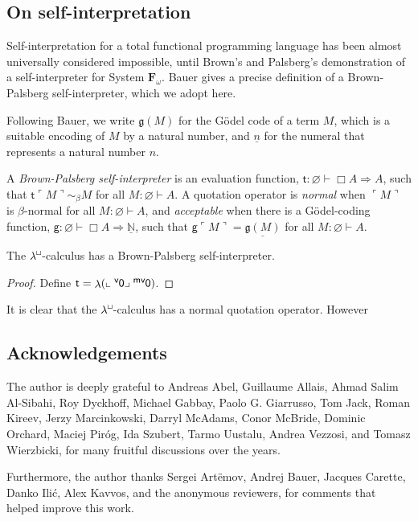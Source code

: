 \documentclass{entcs}
\newcommand{\ssmv}{\textsf{\small{mv}}}
\newcommand{\ssv}{\textsf{\small{v}}}
\newcommand{\R}{\mathrel{\Rightarrow}}
\newcommand{\sq}{\mathop{\Box}}
\renewcommand{\O}{\varnothing}
\renewcommand{\e}{\mathrel{\vdash}}
\newcommand{\lam}{\operatorname{\lambda}}
\newcommand{\quo}[1]{\mathopen{\ulcorner}{#1}\mathclose{\urcorner}}
\newcommand{\unquo}[2]{\mathopen{\llcorner}{#1}\mathclose{\lrcorner}{#2}}
\newcommand{\mvO}{\operatorname{^{\ssmv\mkern-1mu}\textsf{0}}}
\newcommand{\vO}{\operatorname{^{\ssv\mkern-1mu}\textsf{0}}}
\newcommand{\bconv}{\mathrel{\sim_{\beta}}}
\newcommand{\N}{\mathbb{N}}
\newcommand{\lambdabox}{\lambda^{\mkern-1mu\sq\mkern-3mu}}
\newcommand{\Fomega}{\textbf{F}_{\omega}}
\begin{document}
\pagebreak


\subsection*{On self-interpretation}

Self-interpretation for a total functional programming language has been almost universally considered impossible, until Brown's and Palsberg's \cite{BrownP16} demonstration of a self-interpreter for System $\Fomega$.  Bauer \cite{Bauer16} gives a precise definition of a Brown-Palsberg self-interpreter, which we adopt here.

Following Bauer, we write $\mathfrak{g}(M)$ for the G\"{o}del code of a term $M$, which is a suitable encoding of $M$ by a natural number, and $\underline{n}$ for the numeral that represents a natural number $n$.

\begin{definition}
  A \emph{Brown-Palsberg self-interpreter} is an evaluation function, $\textsf{t} : \O \e \sq A \R A$, such that $\textsf{t} \quo{M} \bconv M$ for all $M : \O \e A$.  A quotation operator is \emph{normal} when $\quo{M}$ is $\beta$-normal for all $M : \O \e A$, and \emph{acceptable} when there is a G\"{o}del-coding function, $\textsf{g} : \O \e \sq A \R \underline{\N}$, such that $\textsf{g} \quo{M} = \underline{\mathfrak{g}(M)}$ for all $M : \O \e A$.
\end{definition}

\begin{theorem}
  The $\lambdabox$-calculus has a Brown-Palsberg self-interpreter.
\end{theorem}
\begin{proof}
  Define $\textsf{t} = \lam (\unquo{\vO}{\mvO})$.
\end{proof}

It is clear that the $\lambdabox$-calculus has a normal quotation operator.  However




\subsection*{Acknowledgements}

The author is deeply grateful to Andreas Abel, Guillaume Allais, Ahmad Salim Al-Sibahi, Roy Dyckhoff, Michael Gabbay, Paolo G. Giarrusso, Tom Jack, Roman Kireev, Jerzy Marcinkowski, Darryl McAdams, Conor McBride, Dominic Orchard, Maciej Pir\'{o}g, Ida Szubert, Tarmo Uustalu, Andrea Vezzosi, and Tomasz Wierzbicki, for many fruitful discussions over the years.

Furthermore, the author thanks Sergei Art\"emov, Andrej Bauer, Jacques Carette, Danko Ili\'{c}, Alex Kavvos, and the anonymous reviewers, for comments that helped improve this work.






\end{document}
